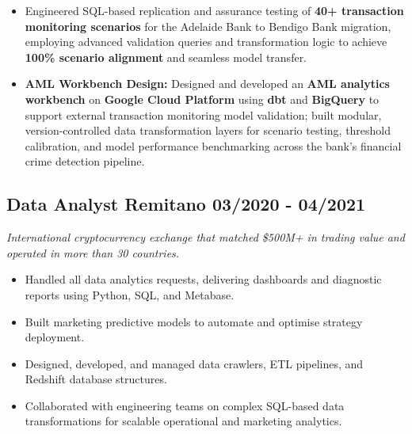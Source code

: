 \documentclass[11pt,a4paper]{article}
\begin{document}
\begin{mdframed}[style=dashedleft]
\begin{itemize}[leftmargin=1.5em, itemsep=4pt]
    \item Engineered SQL-based replication and assurance testing of \textbf{40+ transaction monitoring scenarios} for the Adelaide Bank to Bendigo Bank migration, employing advanced validation queries and transformation logic to achieve \textbf{100\% scenario alignment} and seamless model transfer.
    \item \textbf{AML Workbench Design:} Designed and developed an \textbf{AML analytics workbench} on \textbf{Google Cloud Platform} using \textbf{dbt} and \textbf{BigQuery} to support external transaction monitoring model validation; built modular, version-controlled data transformation layers for scenario testing, threshold calibration, and model performance benchmarking across the bank's financial crime detection pipeline.

\end{itemize}

\vspace{4pt}

\subsection*{Data Analyst \hfill \textbf{Remitano} \hfill 03/2020 - 04/2021}
\textit{International cryptocurrency exchange that matched \$500M+ in trading value and operated in more than 30 countries.}

\begin{itemize}[leftmargin=1.5em, itemsep=4pt]
    \item Handled all data analytics requests, delivering dashboards and diagnostic reports using Python, SQL, and Metabase.
    \item Built marketing predictive models to automate and optimise strategy deployment.
    \item Designed, developed, and managed data crawlers, ETL pipelines, and Redshift database structures.
    \item Collaborated with engineering teams on complex SQL-based data transformations for scalable operational and marketing analytics.
\end{itemize}


\end{mdframed}
\end{document}

